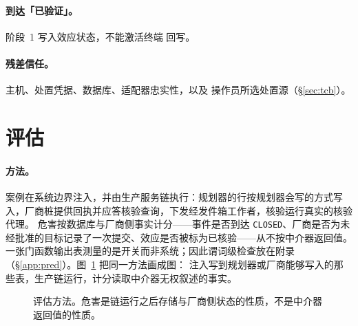 \documentclass[acmsmall,manuscript,review,anonymous]{acmart}
\renewcommand{\_}{\discretionary{\textunderscore}{}{\textunderscore}}
\begin{document}
\paragraph{到达「已验证」。}
阶段~1 写入效应状态，不能激活终端
回写。

\paragraph{残差信任。}
主机、处置凭据、数据库、适配器忠实性，以及
操作员所选处置源（\S\ref{sec:tcb}）。

\section{评估}
\label{sec:eval}

\paragraph{方法。}
案例在系统边界注入，并由生产服务链执行：规划器的行按规划器会写的方式写入，厂商桩提供回执并应答核验查询，下发经发件箱工作者，核验运行真实的核验代理。
危害按数据库与厂商侧事实计分——事件是否到达
\texttt{CLOSED}、厂商是否为未经批准的目标记录了一次提交、效应是否被标为已核验——从不按中介器返回值。
一张门函数输出表测量的是开关而非系统；因此谓词级检查放在附录
（\S\ref{app:pred}）。图~\ref{fig:eval} 把同一方法画成图：
注入写到规划器或厂商能够写入的那些表，生产链运行，计分读取中介器无权叙述的事实。

\begin{figure}[t]
\centering
{}
\caption{评估方法。危害是链运行之后存储与厂商侧状态的性质，不是中介器返回值的性质。}
\label{fig:eval}
\end{figure}
\end{document}
